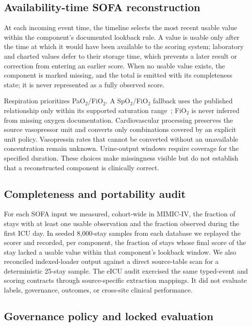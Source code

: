 \documentclass[journal]{IEEEtran}
\begin{document}
\subsection{Availability-time SOFA reconstruction}

At each incoming event time, the timeline selects the most recent usable
value within the component's documented lookback rule. A value is usable only
after the time at which it would have been available to the scoring system;
laboratory and charted values defer to their storage time, which prevents a
later result or correction from entering an earlier score. When no usable
value exists, the component is marked missing, and the total is emitted with
its completeness state; it is never represented as a fully observed score.

Respiration prioritizes PaO$_2$/FiO$_2$. A SpO$_2$/FiO$_2$ fallback uses the
published relationship only within its supported saturation
range~\cite{rice2007}; FiO$_2$ is never inferred from missing oxygen
documentation. Cardiovascular processing preserves the source vasopressor
unit and converts only combinations covered by an explicit unit policy.
Vasopressin rates that cannot be converted without an unavailable
concentration remain unknown. Urine-output windows require coverage for the
specified duration. These choices make missingness visible but do not
establish that a reconstructed component is clinically correct.

\subsection{Completeness and portability audit}

For each SOFA input we measured, cohort-wide in MIMIC-IV, the fraction of
stays with at least one usable observation and the fraction observed during
the first ICU day. In seeded 8,000-stay samples from each database we replayed
the scorer and recorded, per component, the fraction of stays whose final
score of the stay lacked a usable value within that component's lookback
window. We also reconciled indexed-loader output against a
direct source-table scan for a deterministic 25-stay sample. The eICU audit
exercised the same typed-event and scoring contracts through source-specific
extraction mappings. It did not evaluate labels, governance, outcomes, or
cross-site clinical performance.

\subsection{Governance policy and locked evaluation}
\end{document}
